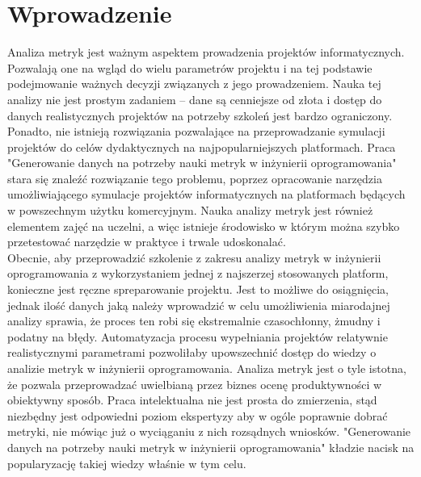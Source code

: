 \section*{Wprowadzenie}
Analiza metryk jest ważnym aspektem prowadzenia projektów informatycznych. Pozwalają one na wgląd do wielu parametrów projektu i na tej podstawie podejmowanie ważnych decyzji związanych z jego prowadzeniem.
Nauka tej analizy nie jest prostym zadaniem -- dane są cenniejsze od złota i dostęp do danych realistycznych projektów na potrzeby szkoleń jest bardzo ograniczony. Ponadto, nie istnieją rozwiązania pozwalające na przeprowadzanie
symulacji projektów do celów dydaktycznych na najpopularniejszych platformach.
Praca "Generowanie danych na potrzeby nauki metryk w inżynierii oprogramowania" stara się znaleźć rozwiązanie tego problemu, poprzez opracowanie narzędzia umożliwiającego symulacje projektów informatycznych na platformach
będących w powszechnym użytku komercyjnym. Nauka analizy metryk jest również elementem zajęć na uczelni, a więc istnieje środowisko w którym można szybko przetestować narzędzie w praktyce i trwale udoskonalać.\\
Obecnie, aby przeprowadzić szkolenie z zakresu analizy metryk w inżynierii oprogramowania z wykorzystaniem jednej z najszerzej stosowanych platform, konieczne jest ręczne spreparowanie projektu.
Jest to możliwe do osiągnięcia, jednak ilość danych jaką należy wprowadzić w celu umożliwienia miarodajnej analizy sprawia, że proces ten robi się ekstremalnie czasochłonny, żmudny i podatny na błędy.
Automatyzacja procesu wypełniania projektów relatywnie realistycznymi parametrami pozwoliłaby upowszechnić dostęp do wiedzy o analizie metryk w inżynierii oprogramowania.
Analiza metryk jest o tyle istotna, że pozwala przeprowadzać uwielbianą przez biznes ocenę produktywności w obiektywny sposób. Praca intelektualna nie jest prosta do zmierzenia, stąd niezbędny jest odpowiedni poziom ekspertyzy
aby w ogóle poprawnie dobrać metryki, nie mówiąc już o wyciąganiu z nich rozsądnych wniosków.
"Generowanie danych na potrzeby nauki metryk w inżynierii oprogramowania" kładzie nacisk na popularyzację takiej wiedzy właśnie w tym celu.

